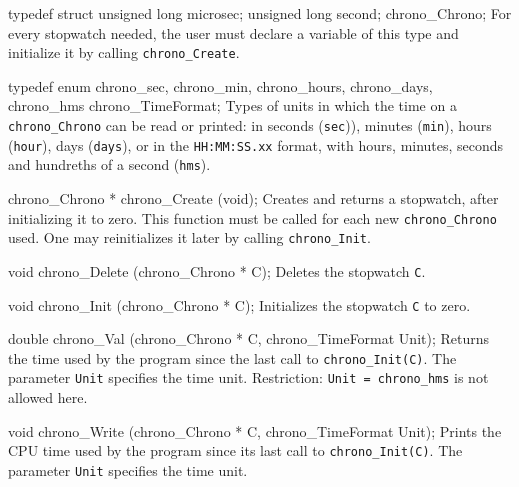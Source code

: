 \iffalse  %
  Even though the ANSI/ISO macro {\tt CLOCKS\_PER\_SEC = 1000000} 
  is the number of clock ticks per second for the value
  returned by the {\tt clock} function (so this function returns the
  number of microseconds), on some systems where the 32-bit type {\tt long} 
  is used to measure time, the value returned by {\tt clock}
  wraps around to negative values after about 36 minutes.
  On some other systems where time is measured using the 32-bit type
  {\tt unsigned long}, the clock may wrap around to 0 after about 72 minutes.
\fi  %

\code
\iffalse
/* chrono.h for ANSI C */

#ifdef __cplusplus
extern "C" {
#endif
#ifndef CHRONO_H
#define CHRONO_H 
#include "gdef.h"
\fi
\endcode

\newpage
\code

typedef struct {
   unsigned long microsec;
   unsigned long second;
   } chrono_Chrono;
\endcode
  \tab
   For every stopwatch needed, the user must declare a variable of
   this type and initialize it by calling {\tt chrono\_Create}.
  \endtab
\code

typedef enum {
   chrono_sec,
   chrono_min,
   chrono_hours, 
   chrono_days,
   chrono_hms
   } chrono_TimeFormat;
\endcode
 \tab
  Types of units in which the time on a {\tt chrono\_Chrono} can be 
  read or printed:
  in seconds ({\tt sec})), minutes ({\tt min}), hours ({\tt hour}), days
  ({\tt days}), or in the {\tt HH:MM:SS.xx} format, with hours, 
  minutes, seconds and hundreths of a second ({\tt hms}).
 \endtab


\code

chrono_Chrono * chrono_Create (void);
\endcode
  \tab
   Creates and returns a stopwatch, after initializing it to zero. This
   function must be called for each new {\tt chrono\_Chrono} used.
   One may reinitializes it later by calling {\tt chrono\_Init}.
  \endtab
\code

void chrono_Delete (chrono_Chrono * C);
\endcode
  \tab
   Deletes the stopwatch {\tt C}.
  \endtab
\code

void chrono_Init (chrono_Chrono * C);
\endcode
  \tab
  Initializes the stopwatch {\tt C} to zero.
  \endtab
\code

double chrono_Val (chrono_Chrono * C, chrono_TimeFormat Unit);
\endcode
  \tab
  Returns the time used by the program since the last call to
  {\tt chrono\_Init(C)}. The parameter {\tt Unit} specifies the time unit.
  Restriction: {\tt Unit = chrono\_hms} is not allowed here.
  \endtab
\code

void chrono_Write (chrono_Chrono * C, chrono_TimeFormat Unit);
\endcode
 \tab
  Prints the CPU time used by the program since its last
  call to {\tt chrono\_Init(C)}.
  The parameter {\tt Unit} specifies the time unit.
 \endtab
\code
\iffalse
#endif
#ifdef __cplusplus
}
#endif
\fi\endcode
